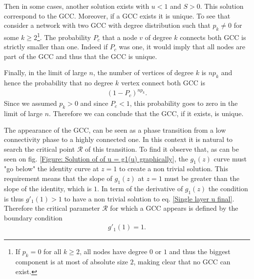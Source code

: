\documentclass[
11pt, %
english, %
singlespacing, %
nolistspacing, %
liststotoc, %
headsepline, %
]{MastersDoctoralThesis} %
\begin{document}
Then in some cases, another solution exists with $u < 1$ and $S > 0$. This solution correspond to the GCC. Moreover, if a GCC exists it is unique. To see that consider a network with two GCC with degree distribution such that $p_k \neq 0$ for some $k \geq 2$\footnote{If $p_k = 0$ for all $k \geq 2$, all nodes have degree $0$ or $1$ and thus the biggest component is at most of absolute size $2$, making clear that no GCC can exist.}. The probability $P_c$ that a node $v$ of degree $k$ connects both GCC is strictly smaller than one. Indeed if $P_c$ was one, it would imply that all nodes are part of the GCC and thus that the GCC is unique.

Finally, in the limit of large $n$, the number of vertices of degree $k$ is $n p_k$ and hence the probability that no degree $k$ vertex connect both GCC is
\begin{align}
	(1 - P_c)^{n p_k}.
\end{align}
Since we assumed $p_k > 0$ and since $P_c < 1$, this probability goes to zero in the limit of large $n$. Therefore we can conclude that the GCC, if it exists, is unique.

The appearance of the GCC, can be seen as a phase transition from a low connectivity phase to a highly connected one. In this context it is natural to search the critical point $\mathcal{R}$ of this transition. To find it observe that, as can be seen on fig. \ref{Figure: Solution of of u = g1(u) graphically}, the $g_1(z)$ curve must "go below" the identity curve at $z = 1$ to create a non trivial solution. This requirement means that the slope of $g_1(z)$ at $z = 1$ must be greater than the slope of the identity, which is $1$. In term of the derivative of $g_1(z)$ the condition is thus $g'_1(1) > 1$ to have a non trivial solution to eq. \eqref{Single layer u final}. Therefore the critical parameter $\mathcal{R}$ for which a GCC appears is defined by the boundary condition
\begin{align}
	g'_1(1) = 1. \label{Boundary condition for single layer}
\end{align}
\end{document}
